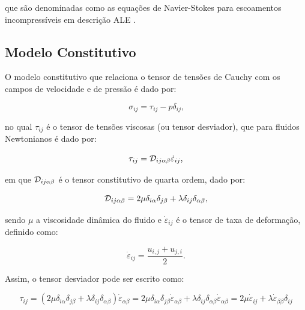 \documentclass[_ArquivoPrincipal.tex]{subfiles}
\begin{document}
\noindent que são denominadas como as equações de Navier-Stokes para escoamentos incompressíveis em descrição ALE \cite{bazilevs2013computational}.

\subsection{Modelo Constitutivo} \label{MC}

O modelo constitutivo que relaciona o tensor de tensões de Cauchy com os campos de velocidade e de pressão é dado por:

\begin{equation}
    \sigma_{ij}=\tau_{ij}-p\delta_{ij}\text{,}\label{eq:const1}
\end{equation}

\noindent no qual $\tau_{ij}$ é o tensor de tensões viscosas (ou tensor desviador), que para fluidos Newtonianos é dado por:

\begin{equation}
    \tau_{ij}=\mathcal{D}_{ij\alpha\beta}\dot{\varepsilon}_{ij}\text{,}
\end{equation}

\noindent em que $\mathcal{D}_{ij\alpha\beta}$ é o tensor constitutivo de quarta ordem, dado por:

\begin{equation}
    \mathcal{D}_{ij\alpha\beta}=2\mu\delta_{i\alpha}\delta_{j\beta}+\lambda\delta_{ij}\delta_{\alpha\beta}\text{,}
\end{equation}

\noindent sendo $\mu$ a viscosidade dinâmica do fluido e $\dot{\varepsilon}_{ij}$ é o tensor de taxa de deformação, definido como:

\begin{equation}
    \dot{\varepsilon}_{ij}=\frac{u_{i,j}+u_{j,i}}{2}\text{.}\label{eq:deftax1}
\end{equation}

Assim, o tensor desviador pode ser escrito como:

\[\tau_{ij}=(2\mu\delta_{i\alpha}\delta_{j\beta}+\lambda\delta_{ij}\delta_{\alpha\beta})\dot{\varepsilon}_{\alpha\beta}=2\mu\delta_{i\alpha}\delta_{j\beta}\dot{\varepsilon}_{\alpha\beta}+\lambda\delta_{ij}\delta_{\alpha\beta}\dot{\varepsilon}_{\alpha\beta}=2\mu\dot{\varepsilon}_{ij}+\lambda\dot{\varepsilon}_{\beta\beta}\delta_{ij}\]
\end{document}
